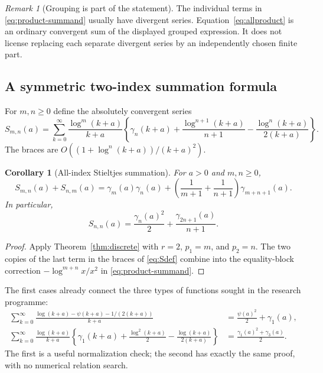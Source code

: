\documentclass[11pt,letterpaper]{article}
\numberwithin{equation}{section}
\theoremstyle{plain}
\newtheorem{corollary}[theorem]{Corollary}
\theoremstyle{definition}
\theoremstyle{remark}
\newtheorem{remark}[theorem]{Remark}
\begin{document}
\begin{remark}[Grouping is part of the statement]
The individual terms in \eqref{eq:product-summand} usually have divergent
series. Equation~\eqref{eq:allproduct} is an ordinary convergent sum of
the displayed grouped expression. It does not license replacing each
separate divergent series by an independently chosen finite part.
\end{remark}

\subsection{A symmetric two-index summation formula}

For $m,n\ge0$ define the absolutely convergent series
\begin{equation}\label{eq:Sdef}
 S_{m,n}(a)=\sum_{k=0}^{\infty}
 \frac{\log^m(k+a)}{k+a}
 \left\{\gamma_n(k+a)+\frac{\log^{n+1}(k+a)}{n+1}
                  -\frac{\log^n(k+a)}{2(k+a)}\right\}.
\end{equation}
The braces are $O((1+\log^n(k+a))/(k+a)^2)$.

\begin{corollary}[All-index Stieltjes summation]\label{cor:Stwo}
For $a>0$ and $m,n\ge0$,
\begin{equation}\label{eq:Stwo}
 \boxed{\displaystyle S_{m,n}(a)+S_{n,m}(a)
 =\gamma_m(a)\gamma_n(a)+
 \left(\frac1{m+1}+\frac1{n+1}\right)\gamma_{m+n+1}(a).}
\end{equation}
In particular,
\begin{equation}\label{eq:Ssquare}
 S_{n,n}(a)=\frac{\gamma_n(a)^2}{2}
                      +\frac{\gamma_{2n+1}(a)}{n+1}.
\end{equation}
\end{corollary}
\begin{proof}
Apply Theorem~\ref{thm:discrete} with $r=2$, $p_1=m$, and $p_2=n$.
The two copies of the last term in the braces of \eqref{eq:Sdef}
combine into the equality-block correction
$-\log^{m+n}x/x^2$ in \eqref{eq:product-summand}.
\end{proof}

The first cases already connect the three types of functions sought in
the research programme:
\begin{align}
 \sum_{k=0}^{\infty}
 \frac{\log(k+a)-\psi(k+a)-1/(2(k+a))}{k+a}
 &=\frac{\psi(a)^2}{2}+\gamma_1(a),\label{eq:digamma-square}\\
 \sum_{k=0}^{\infty}\frac{\log(k+a)}{k+a}
 \left\{\gamma_1(k+a)+\frac{\log^2(k+a)}2
           -\frac{\log(k+a)}{2(k+a)}\right\}
 &=\frac{\gamma_1(a)^2+\gamma_3(a)}2.\label{eq:gamma1-square}
\end{align}
The first is a useful normalization check; the second has exactly the
same proof, with no numerical relation search.
\end{document}
